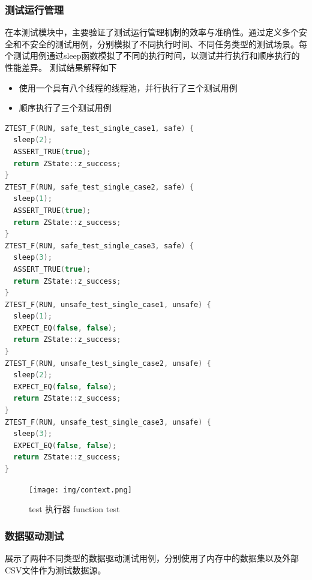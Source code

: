 \documentclass{article}
\begin{document}
\subsubsection{测试运行管理}
在本测试模块中，主要验证了测试运行管理机制的效率与准确性。通过定义多个安全和不安全的测试用例，分别模拟了不同执行时间、不同任务类型的测试场景。每个测试用例通过sleep函数模拟了不同的执行时间，以测试并行执行和顺序执行的性能差异。
测试结果解释如下
\begin{itemize}
    \item 使用一个具有八个线程的线程池，并行执行了三个测试用例
    \item 顺序执行了三个测试用例
\end{itemize}
\begin{framed}
    \begin{lstlisting}[language=C++]
ZTEST_F(RUN, safe_test_single_case1, safe) {
  sleep(2);
  ASSERT_TRUE(true);
  return ZState::z_success;
}
ZTEST_F(RUN, safe_test_single_case2, safe) {
  sleep(1);
  ASSERT_TRUE(true);
  return ZState::z_success;
}
ZTEST_F(RUN, safe_test_single_case3, safe) {
  sleep(3);
  ASSERT_TRUE(true);
  return ZState::z_success;
}
ZTEST_F(RUN, unsafe_test_single_case1, unsafe) {
  sleep(1);
  EXPECT_EQ(false, false);
  return ZState::z_success;
}
ZTEST_F(RUN, unsafe_test_single_case2, unsafe) {
  sleep(2);
  EXPECT_EQ(false, false);
  return ZState::z_success;
}
ZTEST_F(RUN, unsafe_test_single_case3, unsafe) {
  sleep(3);
  EXPECT_EQ(false, false);
  return ZState::z_success;
}
\end{lstlisting}
\end{framed}
\begin{figure}[H]
    \centering
    \texttt{[image: img/context.png]}
    \caption{test 执行器 function test}
    \label{fig:test 执行器 function test}
\end{figure}

\subsubsection{数据驱动测试}
展示了两种不同类型的数据驱动测试用例，分别使用了内存中的数据集以及外部CSV文件作为测试数据源。
\end{document}

